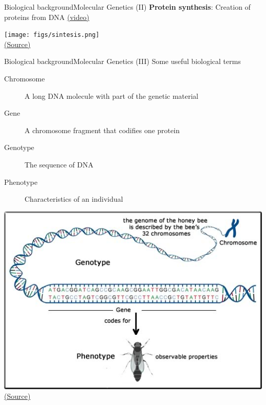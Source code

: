 \documentclass[10pt,compress]{beamer} %
\begin{document}
\begin{frame}[plain]{Biological background}{Molecular Genetics (II)}
		\textbf{Protein synthesis}: Creation of proteins from DNA \href{https://www.youtube.com/watch?v=gG7uCskUOrA}{(video)}
		\begin{center}
		\texttt{[image: figs/sintesis.png]}\\
		\tiny \href{http://www.virtual.unal.edu.co/cursos/ingenieria/2001832/lecciones/traduccion.html}{(Source)}
		\end{center}
\end{frame}

\begin{frame}{Biological background}{Molecular Genetics (III)}
	Some useful biological terms
	\begin{description}
	\item[Chromosome] A long DNA molecule with part of the genetic material
	\item[Gene] A chromosome fragment that codifies one protein

	\bigskip

	\item[Genotype] The sequence of DNA
	\item[Phenotype] Characteristics of an individual
	\end{description}

	\begin{center}

	\includegraphics[width=0.5\linewidth]{figs/gene.jpg}\\
	\tiny \href{https://killowen.com/assets/phenotype.jpg}{(Source)}

	\end{center}
\end{frame}
\end{document}
